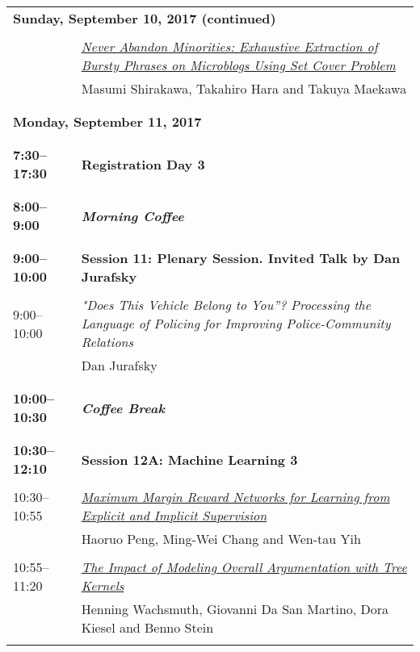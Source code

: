 \begin{tabular}{p{20mm}p{128mm}}
\\
\multicolumn{2}{l}{\bf Sunday, September 10, 2017 (continued)} \\\\
 & \hyperlink{page.2341}{\em Never Abandon Minorities: Exhaustive Extraction of Bursty Phrases on Microblogs Using Set Cover Problem}\\
         & Masumi Shirakawa, Takahiro Hara and Takuya Maekawa \\
\\

\\\multicolumn{2}{l}{\bf Monday, September 11, 2017} \\
\\
\\{\bf 7:30--17:30} & {\bf Registration Day 3} \\
\\
\\{\bf 8:00--9:00} & {\bf\em Morning Coffee} \\
\\
\\{\bf 9:00--10:00} & {\bf Session 11: Plenary Session. Invited Talk by Dan Jurafsky } \\
\\
9:00--10:00 & {\em "Does This Vehicle Belong to You”?  Processing the Language of Policing for Improving Police-Community Relations}\\
         & Dan Jurafsky\\
\\
\\{\bf 10:00--10:30} & {\bf\em Coffee Break} \\
\\
\\{\bf 10:30--12:10} & {\bf Session 12A: Machine Learning 3 } \\
\\
10:30--10:55 & \hyperlink{page.2351}{\em Maximum Margin Reward Networks for Learning from Explicit and Implicit Supervision}\\
         & Haoruo Peng, Ming-Wei Chang and Wen-tau Yih \\
\\

10:55--11:20 & \hyperlink{page.2362}{\em The Impact of Modeling Overall Argumentation with Tree Kernels}\\
         & Henning Wachsmuth, Giovanni Da San Martino, Dora Kiesel and Benno Stein \\
\\


\end{tabular}

